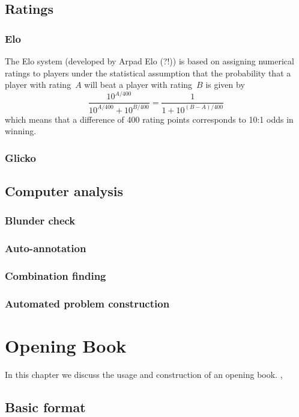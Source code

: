 \documentclass[10pt,dvipdfmx]{report}
\begin{document}
\section{Ratings}
\subsection{Elo}
The Elo system (developed by Arpad Elo (?!)) is based on assigning numerical ratings to
players under the statistical assumption that the probability that a player with rating~$A$
will beat a player with rating~$B$ is given by
\[ \frac{10^{A/400}}{10^{A/400} + 10^{B/400}} = \frac{1}{1 + 10^{(B-A)/400}} \]
which means that a difference of 400 rating points corresponds to 10:1 odds in winning.

\subsection{Glicko}

\section{Computer analysis}
\subsection{Blunder check}
\subsection{Auto-annotation}
\subsection{Combination finding}
\subsection{Automated problem construction}

\chapter{Opening Book}
\label{chap-opening}

In this chapter we discuss the usage and construction of an opening book.
\cite{buro}, \cite{donningerlorenz}

\section{Basic format}
\end{document}
